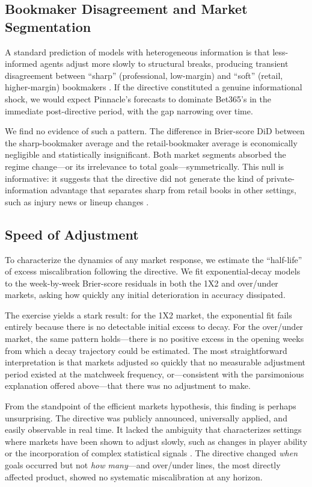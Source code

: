 \subsection{Bookmaker Disagreement and Market Segmentation}\label{subsec:disagreement}

A standard prediction of models with heterogeneous information is that
less-informed agents adjust more slowly to structural breaks, producing
transient disagreement between ``sharp'' (professional, low-margin) and
``soft'' (retail, higher-margin) bookmakers \citep{Levitt2004}. If the
directive constituted a genuine informational shock, we would expect
Pinnacle's forecasts to dominate Bet365's in the immediate
post-directive period, with the gap narrowing over time.

We find no evidence of such a pattern. The difference in Brier-score DiD
between the sharp-bookmaker average and the retail-bookmaker average is
economically negligible and statistically insignificant. Both market
segments absorbed the regime change---or its irrelevance to total
goals---symmetrically. This null is informative: it suggests that the
directive did not generate the kind of private-information advantage that
separates sharp from retail books in other settings, such as injury news
or lineup changes \citep{Croxson2014}.

\subsection{Speed of Adjustment}\label{subsec:halflife}

To characterize the dynamics of any market response, we estimate the
``half-life'' of excess miscalibration following the directive. We fit
exponential-decay models to the week-by-week Brier-score residuals in
both the 1X2 and over/under markets, asking how quickly any initial
deterioration in accuracy dissipated.

The exercise yields a stark result: for the 1X2 market, the exponential
fit fails entirely because there is no detectable initial excess to
decay. For the over/under market, the same pattern holds---there is no
positive excess in the opening weeks from which a decay trajectory could
be estimated. The most straightforward interpretation is that markets
adjusted so quickly that no measurable adjustment period existed at the
matchweek frequency, or---consistent with the parsimonious explanation
offered above---that there was no adjustment to make.

From the standpoint of the efficient markets hypothesis, this finding is
perhaps unsurprising. The directive was publicly announced, universally
applied, and easily observable in real time. It lacked the ambiguity that
characterizes settings where markets have been shown to adjust slowly,
such as changes in player ability \citep{Massey2013} or the
incorporation of complex statistical signals \citep{Brown1993}. The
directive changed \emph{when} goals occurred but not \emph{how many}---and
over/under lines, the most directly affected product, showed no
systematic miscalibration at any horizon.


